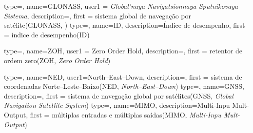 {type=\acronymtype,
  name=GLONASS,
  user1 = {\emph{Global'naya Navigatsionnaya Sputnikovaya Sistema}},
  description=,
  first = {sistema global de navegação por satélite(GLONASS, )}
}
{type=\acronymtype,
  name=ID,
  description={Índice de desempenho},
  first = {índice de desempenho(ID)}
}

{type=\acronymtype,
  name=ZOH,
  user1 = {Zero Order Hold},
  description={\emph{}},
  first = {retentor de ordem zero(ZOH, \emph{Zero Order Hold})}
}

{type=\acronymtype,
  name=NED,
  user1={North--East--Down},
  description={\emph{}},
  first = {sistema de coordenadas Norte--Leste--Baixo(NED, \emph{North--East--Down})}
}
{type=\acronymtype,
  name=GNSS,
  description={\emph{}},
  first = {sistema de navegação global por satélites(GNSS, \emph{Global Navigation Satellite System})}
}
{type=\acronymtype,
  name=MIMO,
  description={Multi-Inpu Mult-Output},
  first = {múltiplas entradas e múltiplas saídas(MIMO, \emph{Multi-Inpu Mult-Output})}
}
